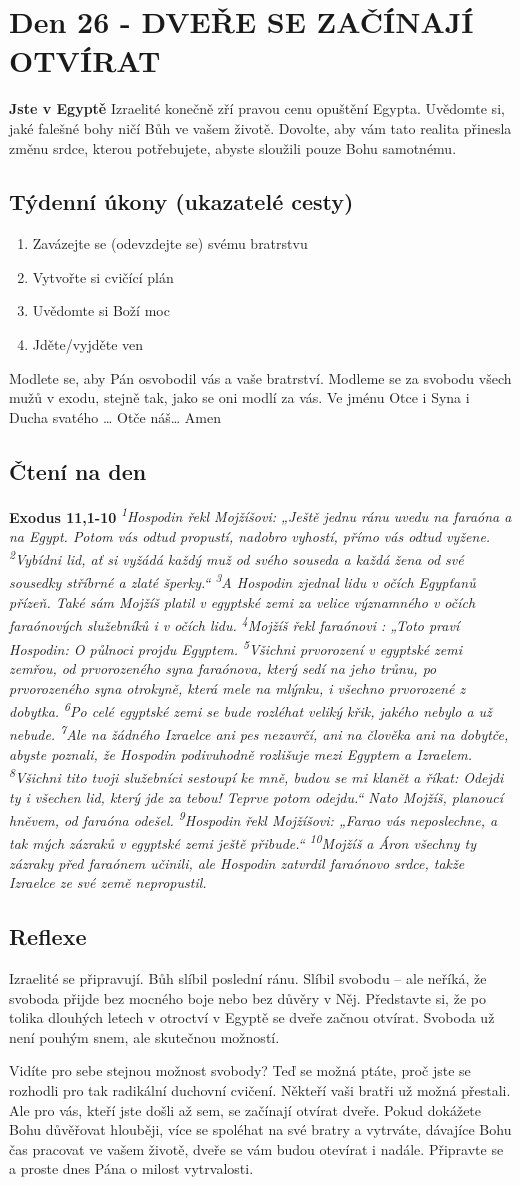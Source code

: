 \documentclass[11pt]{article}
\newcommand{\zacatekCtvrtyTyden}{
  \textbf{Jste v Egyptě} \newline
  Izraelité konečně zří pravou cenu opuštění Egypta. Uvědomte si, jaké falešné bohy ničí Bůh ve vašem životě.
Dovolte, aby vám tato realita přinesla změnu srdce, kterou potřebujete, abyste sloužili pouze Bohu samotnému.

\subsection*{Týdenní úkony (ukazatelé cesty)}
\begin{enumerate}
  \item Zavázejte se (odevzdejte se) svému bratrstvu
  \item Vytvořte si cvičící plán
  \item Uvědomte si Boží moc
  \item Jděte/vyjděte ven
\end{enumerate}
Modlete se, aby Pán osvobodil vás a vaše bratrství. \newline
Modleme se za svobodu všech mužů v exodu, stejně tak, jako se oni modlí za vás.\newline
Ve jménu Otce i Syna i Ducha svatého …  Otče náš… Amen
}
\begin{document}
\newpage
\section{Den 26 - DVEŘE SE ZAČÍNAJÍ OTVÍRAT}
\zacatekCtvrtyTyden
\subsection*{Čtení na den}
\textbf{Exodus 11,1-10}
\newline
\textit{
\textsuperscript{1}Hospodin řekl Mojžíšovi: „Ještě jednu ránu uvedu na faraóna a na Egypt. Potom vás odtud propustí, nadobro vyhostí, přímo vás odtud vyžene.
\textsuperscript{2}Vybídni lid, ať si vyžádá každý muž od svého souseda a každá žena od své sousedky stříbrné a zlaté šperky.“
\textsuperscript{3}A Hospodin zjednal lidu v očích Egypťanů přízeň. Také sám Mojžíš platil v egyptské zemi za velice významného v očích faraónových služebníků i v očích lidu.
\textsuperscript{4}Mojžíš řekl faraónovi : „Toto praví Hospodin: O půlnoci projdu Egyptem.
\textsuperscript{5}Všichni prvorození v egyptské zemi zemřou, od prvorozeného syna faraónova, který sedí na jeho trůnu, po prvorozeného syna otrokyně, která mele na mlýnku, i všechno prvorozené z dobytka.
\textsuperscript{6}Po celé egyptské zemi se bude rozléhat veliký křik, jakého nebylo a už nebude.
\textsuperscript{7}Ale na žádného Izraelce ani pes nezavrčí, ani na člověka ani na dobytče, abyste poznali, že Hospodin podivuhodně rozlišuje mezi Egyptem a Izraelem.
\textsuperscript{8}Všichni tito tvoji služebníci sestoupí ke mně, budou se mi klanět a říkat: Odejdi ty i všechen lid, který jde za tebou! Teprve potom odejdu.“ Nato Mojžíš, planoucí hněvem, od faraóna odešel.
\textsuperscript{9}Hospodin řekl Mojžíšovi: „Farao vás neposlechne, a tak mých zázraků v egyptské zemi ještě přibude.“
\textsuperscript{10}Mojžíš a Áron všechny ty zázraky před faraónem učinili, ale Hospodin zatvrdil faraónovo srdce, takže Izraelce ze své země nepropustil.  
}

\subsection*{Reflexe}
Izraelité se připravují. Bůh slíbil poslední ránu. Slíbil svobodu – ale neříká, že svoboda přijde bez
mocného boje nebo bez důvěry v Něj. Představte si, že po tolika dlouhých letech v otroctví v Egyptě se
dveře začnou otvírat. Svoboda už není pouhým snem, ale skutečnou možností.

Vidíte pro sebe stejnou možnost svobody? Teď se možná ptáte, proč jste se rozhodli pro tak radikální
duchovní cvičení. Někteří vaši bratři už možná přestali. Ale pro vás, kteří jste došli až sem, se začínají
otvírat dveře. Pokud dokážete Bohu důvěřovat hlouběji, více se spoléhat na své bratry a vytrváte, dávajíce
Bohu čas pracovat ve vašem životě, dveře se vám budou otevírat i nadále. Připravte se a proste dnes Pána
o milost vytrvalosti.
\end{document}
